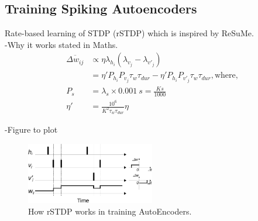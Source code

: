 \documentclass{article}
\begin{document}
\subsection{Training Spiking Autoencoders}
Rate-based learning of STDP (rSTDP) which is inspired by ReSuMe.\\
-Why it works stated in Maths.\\
\begin{equation}
\begin{aligned}
\overline{\Delta w_{ij}} &\propto \eta \lambda_{h_i}(\lambda_{v_j} - \lambda_{v'_j})\\
&=\eta'P_{h_i}P_{v_j}\tau_{w} \tau_{dur} - \eta'P_{h_i}P_{v'_j}\tau_{w} \tau_{dur}, \textrm{where,}\\
P_{s} &= \lambda_{s} \times 0.001~s = \frac{K s}{1000}\\
\eta' &= \frac{10^6}{K^2 \tau_{w} \tau_{dur}} \eta
\end{aligned}
\end{equation}

-Figure to plot
\begin{figure}
	\centering
	\includegraphics[width=0.5\textwidth]{rSTDP}
	\caption{How rSTDP works in training AutoEncoders.}
	\label{fig:rSTDP}
\end{figure}
\end{document}
